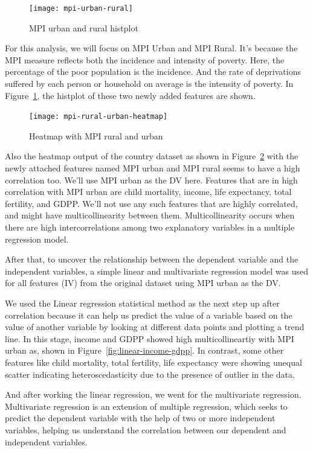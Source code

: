 \documentclass{swfuthesise}
\begin{document}
\begin{figure}[!htp]
    \centering
    \texttt{[image: mpi-urban-rural]}
    \caption{MPI urban and rural histplot}
    \label{fig:mpi-urban-rural}
\end{figure}

For this analysis, we will focus on MPI Urban and MPI Rural. It's because the MPI measure reflects both the incidence and intensity of poverty. Here, the percentage of the poor population is the incidence. And the rate of deprivations suffered by each person or household on average is the intensity of poverty. In Figure~\ref{fig:mpi-urban-rural}, the histplot of these two newly added features are shown. 

\begin{figure}[!htp]
    \centering \texttt{[image: mpi-rural-urban-heatmap]}
    \caption{Heatmap with MPI rural and urban}
    \label{fig:mpi-urban-rural-heatmap}
\end{figure}

Also the heatmap output of the country dataset as shown in Figure~\ref{fig:mpi-urban-rural-heatmap} with the newly attached features named MPI urban and MPI rural seems to have a high correlation too. We'll use MPI urban as the DV here. Features that are in high correlation with MPI urban are child mortality, income, life expectancy, total fertility, and GDPP. We'll not use any such features that are highly correlated, and might have multicollinearity between them. Multicollinearity occurs when there are high intercorrelations among two explanatory variables in a multiple regression model.

After that, to uncover the relationship between the dependent variable and the independent variables, a simple linear and multivariate regression model was used for all features (IV) from the original dataset using MPI urban as the DV.

We used the Linear regression statistical method as the next step up after correlation because it can help us predict the value of a variable based on the value of another variable by looking at different data points and plotting a trend line. In this stage, income and GDPP showed high multicollineartiy with MPI urban as, shown in Figure~\ref{fig:linear-income-gdpp}. In contrast, some other features like child mortality, total fertility, life expectancy were showing unequal scatter indicating heteroscedasticity due to the presence of outlier in the data. 

And after working the linear regression, we went for the multivariate
regression. Multivariate regression is an extension of multiple regression, which seeks to
predict the dependent variable with the help of two or more independent variables, helping
us understand the correlation between our dependent and independent variables.
\end{document}

